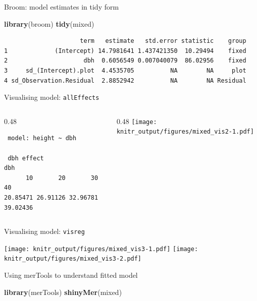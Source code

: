 \documentclass[10pt,ignorenonframetext,]{beamer}
\newenvironment{Shaded}{\begin{snugshade}}{\end{snugshade}}
\newcommand{\KeywordTok}[1]{\textcolor[rgb]{0.13,0.29,0.53}{\textbf{{#1}}}}
\newcommand{\NormalTok}[1]{{#1}}
\def\begincols{\begin{columns}[c]}
\def\endcols{\end{columns}}
\def\begincol{\begin{column}{0.48\textwidth}}
\def\endcol{\end{column}}
\begin{document}
\begin{frame}[fragile]{Broom: model estimates in tidy form}

\begin{Shaded}
\begin{Highlighting}[]
\KeywordTok{library}\NormalTok{(broom)}
\KeywordTok{tidy}\NormalTok{(mixed)}
\end{Highlighting}
\end{Shaded}

\begin{verbatim}
                     term   estimate   std.error statistic    group
1             (Intercept) 14.7981641 1.437421350  10.29494    fixed
2                     dbh  0.6056549 0.007040079  86.02956    fixed
3     sd_(Intercept).plot  4.4535705          NA        NA     plot
4 sd_Observation.Residual  2.8852942          NA        NA Residual
\end{verbatim}

\end{frame}

\begin{frame}[fragile]{Visualising model: \texttt{allEffects}}

\begincols
\begincol

\begin{verbatim}
 model: height ~ dbh

 dbh effect
dbh
      10       20       30       40 
20.85471 26.91126 32.96781 39.02436 
\end{verbatim}

\endcol

\begincol
\texttt{[image: knitr\_output/figures/mixed\_vis2-1.pdf]} \endcol
\endcols

\end{frame}

\begin{frame}{Visualising model: \texttt{visreg}}

\texttt{[image: knitr\_output/figures/mixed\_vis3-1.pdf]}
\texttt{[image: knitr\_output/figures/mixed\_vis3-2.pdf]}

\end{frame}

\begin{frame}[fragile]{Using merTools to understand fitted model}

\begin{Shaded}
\begin{Highlighting}[]
\KeywordTok{library}\NormalTok{(merTools)}
\KeywordTok{shinyMer}\NormalTok{(mixed)}
\end{Highlighting}
\end{Shaded}

\end{frame}
\end{document}
